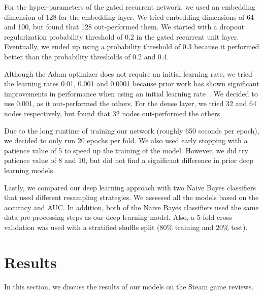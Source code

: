 \documentclass[conference]{IEEEtran}
\begin{document}
For the hyper-parameters of the gated recurrent network, we used an embedding dimension of 128 for the embedding layer. We tried embedding dimensions of 64 and 100, but found that 128 out-performed them. We started with a dropout regularization probability threshold of 0.2 in the gated recurrent unit layer. Eventually, we ended up using a probability threshold of 0.3 because it performed better than the probability thresholds of 0.2 and 0.4. 


Although the Adam optimizer does not require an initial learning rate, we tried the learning rates 0.01, 0.001 and 0.0001 because prior work has shown significant improvements in performance when using an initial learning rate~\cite{wilson2017marginal}. We decided to use 0.001, as it out-performed the others. For the dense layer, we tried 32 and 64 nodes respectively, but found that 32 nodes out-performed the others

 
 Due to the long runtime of training our network (roughly 650 seconds per epoch), we decided to only run 20 epochs per fold. We also used early stopping with a patience value of 5 to speed up the training of the model. However, we did try patience value of 8 and 10, but did not find a significant difference in prior deep learning models. 
 
 
 Lastly, we compared our deep learning approach with two Naive Bayes classifiers that used different resampling strategies. We assessed all the models based on the accuracy and AUC. In addition, both of the Naive Bayes classifiers used the same data pre-processing steps as our deep learning model. Also, a 5-fold cross validation was used with a stratified shuffle split (80\% training and 20\% test).
\section{Results}

In this section, we discuss the results of our models on the Steam game reviews.
\end{document}
